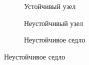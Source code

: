 \begin{figure}[H]
  \centering

  \begin{subfigure}[b]{0.3\textwidth}
    
    \caption{Устойчивый узел}

  \end{subfigure}
  \qquad
  \begin{subfigure}[b]{0.3\textwidth}

    
    \caption{Неустойчивый узел}

  \end{subfigure}
  \qquad
  \begin{subfigure}[b]{0.3\textwidth}

    
    \caption{Неустойчивое седло}

  \end{subfigure}
\end{figure}
